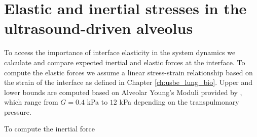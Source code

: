 \section{Elastic and inertial stresses in the ultrasound-driven alveolus}
To access the importance of interface elasticity in the system
dynamics we calculate and compare expected inertial and elastic forces
at the interface. To compute the elastic forces we assume a linear
stress-strain relationship based on the strain of the interface as
defined in Chapter \ref{ch:usbe_lung_bio}. Upper and lower bounds are
computed based on Alveolar Young's Moduli provided by
\cite{Perlman2014}, which range from $G=0.4$ kPa to $12$ kPa depending
on the transpulmonary pressure.

To compute the inertial force

